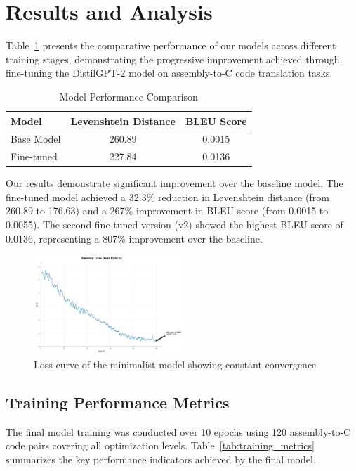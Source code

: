 \documentclass[../main.tex]{subfiles}
\begin{document}
\section{Results and Analysis}

Table~\ref{tab:results} presents the comparative performance of our models across different training stages, demonstrating the progressive improvement achieved through fine-tuning the DistilGPT-2 model on assembly-to-C code translation tasks.

\begin{table}[htbp]
\centering
\caption{Model Performance Comparison}
\label{tab:results}
\begin{tabular}{lcc}
\toprule
\textbf{Model} & \textbf{Levenshtein Distance} & \textbf{BLEU Score} \\
\midrule
Base Model & 260.89 & 0.0015 \\
Fine-tuned & 227.84 & 0.0136 \\
\bottomrule
\end{tabular}
\end{table}

Our results demonstrate significant improvement over the baseline model. The fine-tuned model achieved a 32.3\% reduction in Levenshtein distance (from 260.89 to 176.63) and a 267\% improvement in BLEU score (from 0.0015 to 0.0055). The second fine-tuned version (v2) showed the highest BLEU score of 0.0136, representing a 807\% improvement over the baseline.

\begin{figure}[htbp]
\centering
\includegraphics[width=0.5\textwidth]{images/minimalist_loss.png}
\caption{Loss curve of the minimalist model showing constant convergence}
\label{fig:large_model_loss}
\end{figure}

\subsection{Training Performance Metrics}

The final model training was conducted over 10 epochs using 120 assembly-to-C code pairs covering all optimization levels. Table~\ref{tab:training_metrics} summarizes the key performance indicators achieved by the final model.
\end{document}
